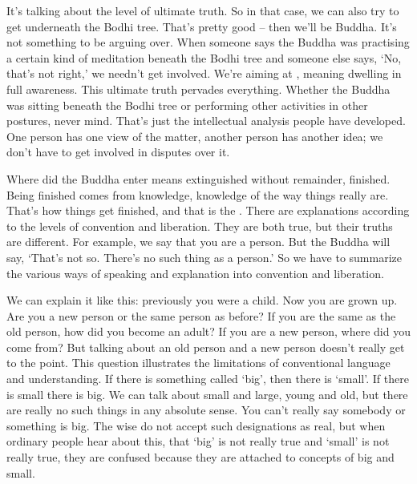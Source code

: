 It's talking about  the level of ultimate truth. So in that case, we can also try to get underneath the Bodhi tree. That's pretty good -- then we'll be Buddha. It's not something to be arguing over. When someone says the Buddha was practising a certain kind of meditation beneath the Bodhi tree and someone else says, `No, that's not right,' we needn't get involved. We're aiming at , meaning dwelling in full awareness. This ultimate truth pervades everything. Whether the Buddha was sitting beneath the Bodhi tree or performing other activities in other postures, never mind. That's just the intellectual analysis people have developed. One person has one view of the matter, another person has another idea; we don't have to get involved in disputes over it. 

Where did the Buddha enter  means extinguished without remainder, finished. Being finished comes from knowledge, knowledge of the way things really are. That's how things get finished, and that is the . There are explanations according to the levels of convention and liberation. They are both true, but their truths are different. For example, we say that you are a person. But the Buddha will say, `That's not so. There's no such thing as a person.' So we have to summarize the various ways of speaking and explanation into convention and liberation. 

We can explain it like this: previously you were a child. Now you are grown up. Are you a new person or the same person as before? If you are the same as the old person, how did you become an adult? If you are a new person, where did you come from? But talking about an old person and a new person doesn't really get to the point. This question illustrates the limitations of conventional language and understanding. If there is something called `big', then there is `small'. If there is small there is big. We can talk about small and large, young and old, but there are really no such things in any absolute sense. You can't really say somebody or something is big. The wise do not accept such designations as real, but when ordinary people hear about this, that `big' is not really true and `small' is not really true, they are confused because they are attached to concepts of big and small. 


